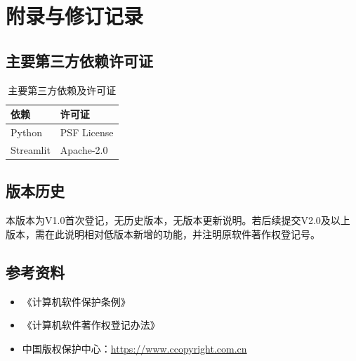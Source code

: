 %
%

\section{附录与修订记录}
\label{sec:appendix}

\subsection{主要第三方依赖许可证}
\label{ssec:license_list}
\begin{table}[H]
\centering
\begin{tabular}{ll}
\toprule
\textbf{依赖} & \textbf{许可证} \\
\midrule
Python & PSF License \\
Streamlit & Apache-2.0 \\
\bottomrule
\end{tabular}
\caption{主要第三方依赖及许可证}
\end{table}

\subsection{版本历史}
\label{ssec:version_history}
本版本为V1.0首次登记，无历史版本，无版本更新说明。若后续提交V2.0及以上版本，需在此说明相对低版本新增的功能，并注明原软件著作权登记号。

\subsection{参考资料}
\label{ssec:references}
\begin{itemize}
    \item 《计算机软件保护条例》
    \item 《计算机软件著作权登记办法》
    \item 中国版权保护中心：\url{https://www.ccopyright.com.cn}
\end{itemize}
